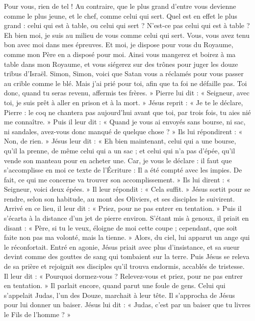  Pour vous, rien de tel ! Au contraire, que le plus grand d’entre vous devienne comme le plus jeune, et le chef, comme celui qui sert.
 Quel est en effet le plus grand : celui qui est à table, ou celui qui sert ? N’est-ce pas celui qui est à table ? Eh bien moi, je suis au milieu de vous comme celui qui sert.
 Vous, vous avez tenu bon avec moi dans mes épreuves.
 Et moi, je dispose pour vous du Royaume, comme mon Père en a disposé pour moi.
 Ainsi vous mangerez et boirez à ma table dans mon Royaume, et vous siégerez sur des trônes pour juger les douze tribus d’Israël.
 Simon, Simon, voici que Satan vous a réclamés pour vous passer au crible comme le blé.
 Mais j’ai prié pour toi, afin que ta foi ne défaille pas. Toi donc, quand tu seras revenu, affermis tes frères. »
 Pierre lui dit : « Seigneur, avec toi, je suis prêt à aller en prison et à la mort. »
 Jésus reprit : « Je te le déclare, Pierre : le coq ne chantera pas aujourd’hui avant que toi, par trois fois, tu aies nié me connaître. »
 Puis il leur dit : « Quand je vous ai envoyés sans bourse, ni sac, ni sandales, avez-vous donc manqué de quelque chose ? »
 Ils lui répondirent : « Non, de rien. » Jésus leur dit : « Eh bien maintenant, celui qui a une bourse, qu’il la prenne, de même celui qui a un sac ; et celui qui n’a pas d’épée, qu’il vende son manteau pour en acheter une.
 Car, je vous le déclare : il faut que s’accomplisse en moi ce texte de l’Écriture : Il a été compté avec les impies. De fait, ce qui me concerne va trouver son accomplissement. »
 Ils lui dirent : « Seigneur, voici deux épées. » Il leur répondit : « Cela suffit. »
 Jésus sortit pour se rendre, selon son habitude, au mont des Oliviers, et ses disciples le suivirent.
 Arrivé en ce lieu, il leur dit : « Priez, pour ne pas entrer en tentation. »
 Puis il s’écarta à la distance d’un jet de pierre environ. S’étant mis à genoux, il priait en disant :
 « Père, si tu le veux, éloigne de moi cette coupe ; cependant, que soit faite non pas ma volonté, mais la tienne. »
 Alors, du ciel, lui apparut un ange qui le réconfortait.
 Entré en agonie, Jésus priait avec plus d’insistance, et sa sueur devint comme des gouttes de sang qui tombaient sur la terre.
 Puis Jésus se releva de sa prière et rejoignit ses disciples qu’il trouva endormis, accablés de tristesse.
 Il leur dit : « Pourquoi dormez-vous ? Relevez-vous et priez, pour ne pas entrer en tentation. »
 Il parlait encore, quand parut une foule de gens. Celui qui s’appelait Judas, l’un des Douze, marchait à leur tête. Il s’approcha de Jésus pour lui donner un baiser.
 Jésus lui dit : « Judas, c’est par un baiser que tu livres le Fils de l’homme ? »
